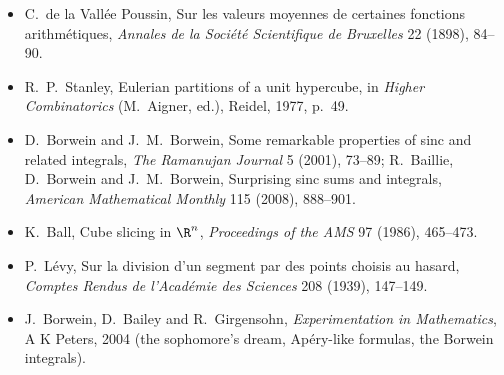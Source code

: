 \begin{itemize}
\item C.~de la Vallée Poussin, Sur les valeurs moyennes de certaines fonctions arithmétiques, \emph{Annales de la Société Scientifique de
Bruxelles} 22 (1898), 84--90.
\item R.~P.~Stanley, Eulerian partitions of a unit hypercube, in \emph{Higher Combinatorics} (M.~Aigner, ed.), Reidel, 1977, p.~49.
\item D.~Borwein and J.~M.~Borwein, Some remarkable properties of sinc and related integrals, \emph{The Ramanujan Journal} 5 (2001), 73--89;
R.~Baillie, D.~Borwein and J.~M.~Borwein, Surprising sinc sums and integrals, \emph{American Mathematical Monthly} 115 (2008), 888--901.
\item K.~Ball, Cube slicing in $\R^n$, \emph{Proceedings of the AMS} 97 (1986), 465--473.
\item P.~Lévy, Sur la division d'un segment par des points choisis au hasard, \emph{Comptes Rendus de l'Académie des Sciences} 208 (1939),
147--149.
\item J.~Borwein, D.~Bailey and R.~Girgensohn, \emph{Experimentation in Mathematics}, A K Peters, 2004 (the sophomore's dream, Apéry-like
formulas, the Borwein integrals).
\end{itemize}
